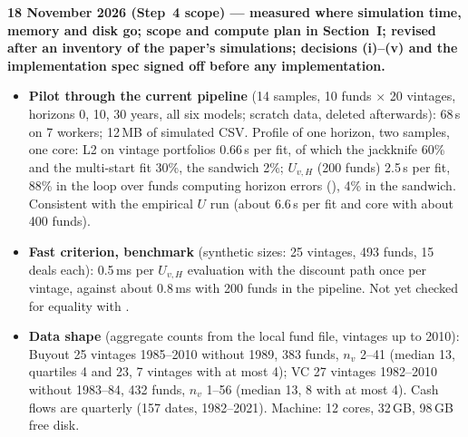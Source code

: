 \documentclass[11pt]{article}
\newcommand{\code}[1]{\texttt{\detokenize{#1}}}
\begin{document}
\textbf{18 November 2026 (Step~4 scope) --- measured where simulation time, memory and disk go; scope and compute plan in Section~I; revised after an inventory of the paper's simulations; decisions (i)--(v) and the implementation spec signed off before any implementation.}
\begin{itemize}
\item \textbf{Pilot through the current pipeline} (14 samples, 10 funds $\times$ 20 vintages, horizons 0, 10, 30 years, all six models; scratch data, deleted afterwards): 68\,s on 7 workers; 12\,MB of simulated CSV. Profile of one horizon, two samples, one core: L2 on vintage portfolios 0.66\,s per fit, of which the jackknife 60\% and the multi-start fit 30\%, the sandwich 2\%; $U_{v,H}$ (200 funds) 2.5\,s per fit, 88\% in the loop over funds computing horizon errors (\code{unit.errors}), 4\% in the sandwich. Consistent with the empirical $U$ run (about 6.6\,s per fit and core with about 400 funds).
\item \textbf{Fast criterion, benchmark} (synthetic sizes: 25 vintages, 493 funds, 15 deals each): 0.5\,ms per $U_{v,H}$ evaluation with the discount path once per vintage, against about 0.8\,ms with 200 funds in the pipeline. Not yet checked for equality with \code{unit.errors}.
\item \textbf{Data shape} (aggregate counts from the local fund file, vintages up to 2010): Buyout 25 vintages 1985--2010 without 1989, 383 funds, $n_v$ 2--41 (median 13, quartiles 4 and 23, 7 vintages with at most 4); VC 27 vintages 1982--2010 without 1983--84, 432 funds, $n_v$ 1--56 (median 13, 8 with at most 4). Cash flows are quarterly (157 dates, 1982--2021). Machine: 12 cores, 32\,GB, 98\,GB free disk.
\end{itemize}
\end{document}
